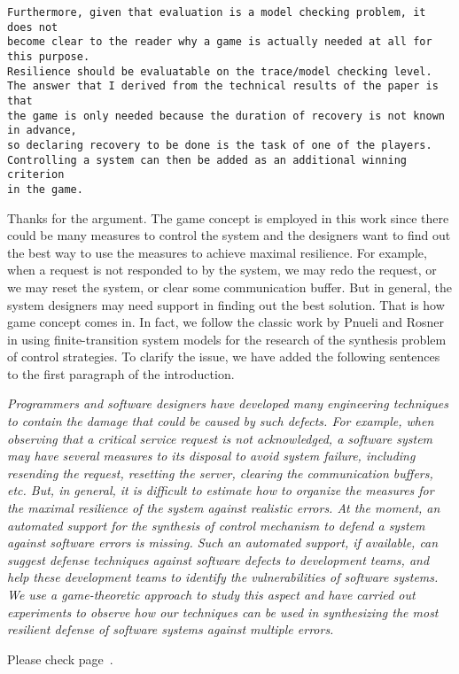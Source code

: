 \documentclass[times,10pt,twocolumn]{article}
\newcounter{cabbage0}
\newcounter{cabbage1}
\newcounter{cabbage2}
\newcounter{cabbage3}
\newcounter{bean0}
\newcounter{bean1}
\newcounter{bean2}
\newcounter{bean3}
\newcounter{bean4}
\newcounter{bean5}
\newcounter{bean6}
\newenvironment{reply1}{\begin{list}{\bf (Reply 1.\arabic{bean1}):} 
        {\usecounter{bean1}\setcounter{bean1}{\value{cabbage1}} \item \setcounter{cabbage1}{\value{bean1}} 
        }
}{\end{list}}
\begin{document}
\begin{verbatim} 
Furthermore, given that evaluation is a model checking problem, it does not 
become clear to the reader why a game is actually needed at all for this purpose. 
Resilience should be evaluatable on the trace/model checking level. 
The answer that I derived from the technical results of the paper is that 
the game is only needed because the duration of recovery is not known in advance, 
so declaring recovery to be done is the task of one of the players. 
Controlling a system can then be added as an additional winning criterion 
in the game.
\end{verbatim} 
\begin{reply1} 
Thanks for the argument.  
The game concept is employed in this work since there could be many measures 
to control the system and the designers want to find out the best way 
to use the measures to achieve maximal resilience.  
For example, when a request is not responded to by the system, 
we may redo the request, or we may reset the system, or clear some communication 
buffer.  
But in general, the system designers may need support in finding out the 
best solution.  
That is how game concept comes in.  
In fact, we follow the classic work by Pnueli and Rosner \cite{PR89a,PR89b} 
in using finite-transition system models for the research of the synthesis problem 
of control strategies.  
To clarify the issue, we have added the following sentences to the first 
paragraph of the introduction. 
\begin{center}
\parbox{140mm}{\em 
Programmers 
and software designers have developed many engineering 
techniques to contain the damage that could be caused by such defects.  
For example, when observing that a critical service request is not 
acknowledged, a software system may have several measures to its disposal to
avoid system failure, including 
resending the request, 
resetting the server, 
clearing the communication buffers, etc. 
But, in general, it is difficult to estimate how to organize the measures 
for the maximal resilience of the system against realistic errors.  
At the moment, an automated support for the synthesis of 
control mechanism to defend a system against software errors is missing.  
Such an automated support, if available, can suggest defense techniques against software defects to development teams,
and help these development teams to identify the vulnerabilities of software systems.    
We use a game-theoretic approach to study this aspect and have
carried out experiments to 
observe how our techniques can be used in synthesizing the most resilient 
defense of software systems against multiple errors.  
}
\end{center} 
Please check page~\pageref{reply1.control.eval.intro}.  
\end{reply1} 
\end{document}
